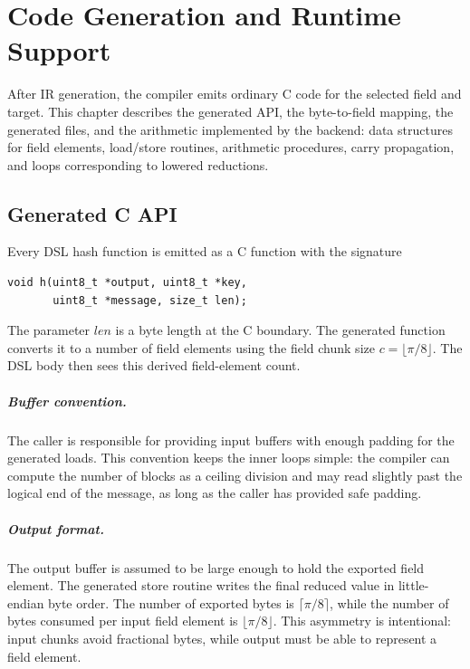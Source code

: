 \chapter{Code Generation and Runtime Support}
\label{ch:codegen-runtime}

After IR generation, the compiler emits ordinary C code for the selected field and target. This chapter describes the generated API, the byte-to-field mapping, the generated files, and the arithmetic implemented by the backend: data structures for field elements, load/store routines, arithmetic procedures, carry propagation, and loops corresponding to lowered reductions.

\section{Generated C API}
\label{sec:generated-c-api}

Every DSL hash function is emitted as a C function with the signature
\begin{lstlisting}[style=thesisC]
void h(uint8_t *output, uint8_t *key,
       uint8_t *message, size_t len);
\end{lstlisting}
The parameter \(len\) is a byte length at the C boundary. The generated function converts it to a number of field elements using the field chunk size \(c=\lfloor \pi/8\rfloor\). The DSL body then sees this derived field-element count.

\paragraph{Buffer convention.}
The caller is responsible for providing input buffers with enough padding for the generated loads. This convention keeps the inner loops simple: the compiler can compute the number of blocks as a ceiling division and may read slightly past the logical end of the message, as long as the caller has provided safe padding.

\paragraph{Output format.}
The output buffer is assumed to be large enough to hold the exported field element. The generated store routine writes the final reduced value in little-endian byte order. The number of exported bytes is \(\lceil \pi/8\rceil\), while the number of bytes consumed per input field element is \(\lfloor \pi/8\rfloor\). This asymmetry is intentional: input chunks avoid fractional bytes, while output must be able to represent a field element.

